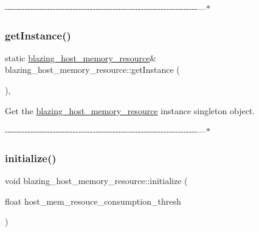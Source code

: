 -\/-\/-\/-\/-\/-\/-\/-\/-\/-\/-\/-\/-\/-\/-\/-\/-\/-\/-\/-\/-\/-\/-\/-\/-\/-\/-\/-\/-\/-\/-\/-\/-\/-\/-\/-\/-\/-\/-\/-\/-\/-\/-\/-\/-\/-\/-\/-\/-\/-\/-\/-\/-\/-\/-\/-\/-\/-\/-\/-\/-\/-\/-\/-\/-\/-\/-\/-\/---$\ast$ \mbox{\label{classblazing__host__memory__resource_a1fa50b80350c0718dc4ee026e8425e7a}} 
\subsubsection{\texorpdfstring{get\+Instance()}{getInstance()}}
{\footnotesize\ttfamily static \hyperlink{classblazing__host__memory__resource}{blazing\+\_\+host\+\_\+memory\+\_\+resource}\& blazing\+\_\+host\+\_\+memory\+\_\+resource\+::get\+Instance (\begin{DoxyParamCaption}{ }\end{DoxyParamCaption})\hspace{0.3cm}{\ttfamily [inline]}, {\ttfamily [static]}}



Get the \hyperlink{classblazing__host__memory__resource}{blazing\+\_\+host\+\_\+memory\+\_\+resource} instance singleton object. 

-\/-\/-\/-\/-\/-\/-\/-\/-\/-\/-\/-\/-\/-\/-\/-\/-\/-\/-\/-\/-\/-\/-\/-\/-\/-\/-\/-\/-\/-\/-\/-\/-\/-\/-\/-\/-\/-\/-\/-\/-\/-\/-\/-\/-\/-\/-\/-\/-\/-\/-\/-\/-\/-\/-\/-\/-\/-\/-\/-\/-\/-\/-\/-\/-\/-\/-\/-\/---$\ast$ \mbox{\label{classblazing__host__memory__resource_a24f72f410d6ef29937661e2fe79fd292}} 
\subsubsection{\texorpdfstring{initialize()}{initialize()}}
{\footnotesize\ttfamily void blazing\+\_\+host\+\_\+memory\+\_\+resource\+::initialize (\begin{DoxyParamCaption}\item[{float}]{host\+\_\+mem\+\_\+resouce\+\_\+consumption\+\_\+thresh }\end{DoxyParamCaption})}



